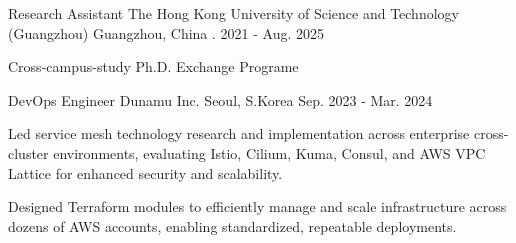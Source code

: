 

\begin{cventries}



  \cventry
    {Research Assistant} %
    {The Hong Kong University of Science and Technology (Guangzhou)} %
    {Guangzhou, China} %
    {. 2021 - Aug. 2025} %
    {
      \begin{cvitems} %
        \item {Cross-campus-study Ph.D. Exchange Programe}
      \end{cvitems}
    }




  \cventry
    {DevOps Engineer} %
    {Dunamu Inc.} %
    {Seoul, S.Korea} %
    {Sep. 2023 - Mar. 2024} %
    {
      \begin{cvitems} %
        \item {Led service mesh technology research and implementation across enterprise cross-cluster environments, evaluating Istio, Cilium, Kuma, Consul, and AWS VPC Lattice for enhanced security and scalability.}
        \item {Designed Terraform modules to efficiently manage and scale infrastructure across dozens of AWS accounts, enabling standardized, repeatable deployments.}
      \end{cvitems}
    }


\end{cventries}

